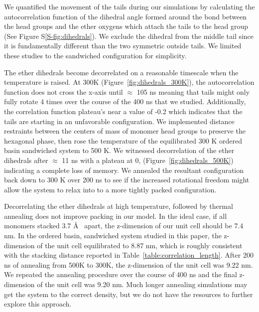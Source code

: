 \documentclass[journal=jpcbfk,manuscript=article]{achemso}
\begin{document}
  We quantified the movement of the tails during our simulations by calculating the 
  autocorrelation function of the dihedral angle formed around the bond between the 
  head groups and the ether oxygens which attach the tails to the head group 
  (See Figure S\ref{S-fig:dihedrals}). We exclude the dihedral from the middle tail 
  since it is fundamentally different than the two symmetric outside tails. We 
  limited these studies to the sandwiched configuration for simplicity.
  
  The ether dihedrals become decorrelated on a reasonable timescale when the temperature
  is raised. At 300K (Figure~\ref{fig:dihedrals_300K}), the autocorrelation function does
  not cross the x-axis until $\approx$ 105 ns meaning that tails might only fully rotate
  4 times over the course of the 400 ns that we studied. Additionally, the correlation 
  function plateau's near a value of -0.2 which indicates that the tails are starting in 
  an unfavorable configuration. We implemented distance restraints between the centers of 
  mass of monomer head groups to preserve the hexagonal phase, then rose the temperature 
  of the equilibrated 300 K ordered basin sandwiched system to 500 K. We witnessed 
  decorrelation of the ether dihedrals after $\approx$ 11 ns with a plateau at 0, 
  (Figure~\ref{fig:dihedrals_500K}) indicating a complete loss of memory. We annealed
  the resultant configuration back down to 300 K over 200 ns to see if the increased rotational
  freedom might allow the system to relax into to a more tightly packed configuration.
  
  Decorrelating the ether dihedrals at high temperature, followed by thermal annealing
  does not improve packing in our model. In the ideal case, if all monomers stacked 
  3.7 \AA~ apart, the z-dimension of our unit cell should be 7.4 nm. In the ordered basin, 
  sandwiched system studied in this paper, the z-dimension of the unit cell equilibrated 
  to 8.87 nm, which is roughly consistent with the stacking distance reported in 
  Table~\ref{table:correlation_length}. After 200 ns of annealing from 500K to 300K, the 
  z-dimension of the unit cell was 9.22 nm. We repeated the annealing procedure over the 
  course of 400 ns and the final z-dimension of the unit cell was 9.20 nm. Much longer
  annealing simulations may get the system to the correct density, but we do not have
  the resources to further explore this approach. 
\end{document}
